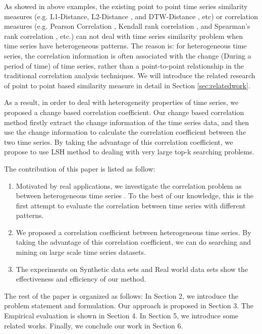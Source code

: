 
As showed in above examples, the existing point to point time series similarity measures (e.g. L1-Distance, L2-Distance \cite{han2011data}, and DTW-Distance \cite{muller2007dynamic}, etc) or correlation measures (e.g. Pearson Correlation \cite{pearson1904mathematical}, Kendall rank correlation \cite{kendall1938new}, and Spearman's rank correlation \cite{pirie1988spearman}, etc.) can not deal with time series similarity problem when time series have heterogeneous patterns.
The reason is: for heterogeneous time series, the correlation information is often associated with the change (During a period of time) of time series, rather than a point-to-point relationship in the traditional correlation analysis techniques. We will introduce the related research of point to point based similarity measure in detail in Section \ref{sec:relatedwork}.

As a result, in order to deal with heterogeneity properties of time series, we proposed a change based correlation coefficient.
Our change based correlation method firstly extract the change information of the time series data, and then use the change information to calculate the correlation coefficient between the two time series.
By taking the advantage of this correlation coefficient, we propose to use LSH method to dealing with very large top-k searching problems.

The contribution of this paper is listed as follow:
\begin{enumerate}
\item Motivated by real applications, we investigate the correlation
problem as between heterogeneous time series .
To the best of our knowledge, this is the first attempt
to evaluate the correlation between time series with different patterns.

\item We proposed a correlation coefficient between heterogeneous time series. By taking the advantage of this correlation coefficient, we can do searching and mining on large scale time series datasets.


\item The experiments on Synthetic data sets and Real world data sets show the effectiveness and efficiency of our method.
\end{enumerate}

The rest of the paper is organized as follows: In Section 2, we introduce the problem
statement and formulation. Our approach is proposed in Section 3. The Empirical evaluation is shown in Section 4. In Section 5, we introduce some
related works. Finally, we conclude our work in Section 6.



